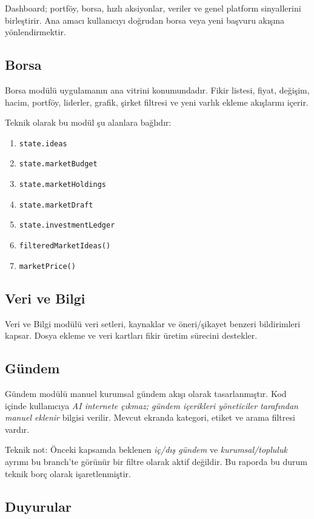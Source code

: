 \documentclass[11pt,a4paper]{article}
\newcommand{\code}[1]{\texttt{#1}}
\begin{document}
Dashboard; portföy, borsa, hızlı aksiyonlar, veriler ve genel platform sinyallerini birleştirir. Ana amacı kullanıcıyı doğrudan borsa veya yeni başvuru akışına yönlendirmektir.

\subsection{Borsa}

Borsa modülü uygulamanın ana vitrini konumundadır. Fikir listesi, fiyat, değişim, hacim, portföy, liderler, grafik, şirket filtresi ve yeni varlık ekleme akışlarını içerir.

Teknik olarak bu modül şu alanlara bağlıdır:

\begin{enumerate}
  \item \code{state.ideas}
  \item \code{state.marketBudget}
  \item \code{state.marketHoldings}
  \item \code{state.marketDraft}
  \item \code{state.investmentLedger}
  \item \code{filteredMarketIdeas()}
  \item \code{marketPrice()}
\end{enumerate}

\subsection{Veri ve Bilgi}

Veri ve Bilgi modülü veri setleri, kaynaklar ve öneri/şikayet benzeri bildirimleri kapsar. Dosya ekleme ve veri kartları fikir üretim sürecini destekler.

\subsection{Gündem}

Gündem modülü manuel kurumsal gündem akışı olarak tasarlanmıştır. Kod içinde kullanıcıya \textit{AI internete çıkmaz; gündem içerikleri yöneticiler tarafından manuel eklenir} bilgisi verilir. Mevcut ekranda kategori, etiket ve arama filtresi vardır.

Teknik not: Önceki kapsamda beklenen \textit{iç/dış gündem} ve \textit{kurumsal/topluluk} ayrımı bu branch'te görünür bir filtre olarak aktif değildir. Bu raporda bu durum teknik borç olarak işaretlenmiştir.

\subsection{Duyurular}
\end{document}
